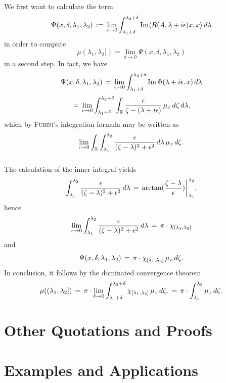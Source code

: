 \documentclass[11pt,twoside]{article}
\begin{document}
We first want to calculate the term
\[
\Psi(x,\delta,\lambda_1,\lambda_2) \eqdef
\lim_{\epsilon \to 0} \int_{\lambda_1+\delta}^{\lambda_2+\delta}
\im \scalar{R(\linA,\lambda + i \epsilon)x}{x} \, d\lambda
\]
in order to compute
\[
\mu(\lambda_1,\lambda_2]) =
\lim_{\delta \to 0} \Psi(x,\delta,\lambda_1,\lambda_2)
\]
in a second step.
In fact, we have
\[
\Psi(x,\delta,\lambda_1,\lambda_2) 
\=
\lim_{\epsilon \to 0} \int_{\lambda_1+\delta}^{\lambda_2+\delta}
\im \Phi(\lambda+ i \epsilon,x) \, d\lambda
\]
\[
\=
\lim_{\epsilon \to 0} \int_{\lambda_1+\delta}^{\lambda_2+\delta}
\int_{\R} \frac{\epsilon}{\zeta-(\lambda +i \epsilon)} \, \mu_x \, d\zeta \, d\lambda,
\]
which by \textsc{Fubini}'s integration formula may be written as
\[
\lim_{\epsilon \to 0} \int_{\R}
\int_{\lambda_1}^{\lambda_2} \frac{\epsilon}{(\zeta-\lambda)^2 + \epsilon^2} \, d\lambda \, \mu_x \, d\zeta.
\]

\subparagraph{}
The calculation of the inner integral yields
\[
\int_{\lambda_1}^{\lambda_2} \frac{\epsilon}{(\zeta-\lambda)^2 + \epsilon^2} \, d\lambda \=
\arctan(\frac{\zeta-\lambda}{\epsilon}) \bigg|_{\,\lambda_1}^{\,\lambda_2},
\]
hence
\[
\lim_{\epsilon \to 0} 
\int_{\lambda_1}^{\lambda_2} \frac{\epsilon}{(\zeta-\lambda)^2 + \epsilon^2} \, d\lambda \=
\pi \cdot \chi_{[\lambda_1,\lambda_2]}
\]
and
\[
\Psi(x,\delta,\lambda_1,\lambda_2) \=
\pi \cdot \chi_{[\lambda_1,\lambda_2]} \, \mu_x \, d\zeta.
\]
In conclusion,
it follows by the dominated convergence theorem
\[
\mu((\lambda_1,\lambda_2]) \= \pi \cdot
\lim_{\delta \to 0} \int_{\lambda_1+\delta}^{\lambda_2+\delta} \chi_{[\lambda_1,\lambda_2]} \, \mu_x \, d\zeta.
\= 
\pi \cdot \int_{\lambda_1}^{\lambda_2} \mu_x \, d\zeta.
\]

\section{Other Quotations and Proofs}                                          %

\section{Examples and Applications}                                            %
\end{document}
